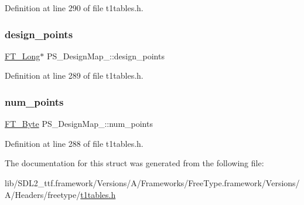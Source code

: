 Definition at line 290 of file t1tables.\+h.

\mbox{\label{struct_p_s___design_map___abd7a86ba33248ceed657c31063b49679}} 
\subsubsection{\texorpdfstring{design\_points}{design\_points}}
{\footnotesize\ttfamily \mbox{\hyperlink{fttypes_8h_a7fa72a1f0e79fb1860c5965789024d6f}{F\+T\+\_\+\+Long}}$\ast$ P\+S\+\_\+\+Design\+Map\+\_\+\+::design\+\_\+points}



Definition at line 289 of file t1tables.\+h.

\mbox{\label{struct_p_s___design_map___a505a70dd0f497f177fffca9bc4e5d0a5}} 
\subsubsection{\texorpdfstring{num\_points}{num\_points}}
{\footnotesize\ttfamily \mbox{\hyperlink{fttypes_8h_a51f26183ca0c9f4af958939648caeccd}{F\+T\+\_\+\+Byte}} P\+S\+\_\+\+Design\+Map\+\_\+\+::num\+\_\+points}



Definition at line 288 of file t1tables.\+h.



The documentation for this struct was generated from the following file\+:\begin{DoxyCompactItemize}
\item 
lib/\+S\+D\+L2\+\_\+ttf.\+framework/\+Versions/\+A/\+Frameworks/\+Free\+Type.\+framework/\+Versions/\+A/\+Headers/freetype/\mbox{\hyperlink{t1tables_8h}{t1tables.\+h}}\end{DoxyCompactItemize}
